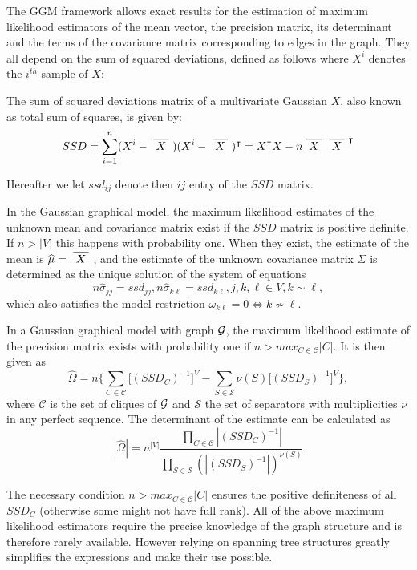 The GGM framework allows exact results for the estimation of maximum likelihood estimators of the mean vector, the precision matrix, its determinant and the terms of the covariance matrix corresponding to edges in the graph. They all depend on the sum of squared deviations, defined as follows where $X^i$ denotes the $i^{th}$ sample of $X$:
\begin{definition}
The sum of squared deviations matrix of a multivariate Gaussian $X$, also known as total sum of squares,  is given by:
$$SSD = \sum_{i=1}^n (X^i - \xbar{X})(X^i - \xbar{X})^\intercal = X^\intercal X - n  \xbar{X} \xbar{X}^\intercal$$
\end{definition}
Hereafter we let $ssd_{ij}$ denote then $ij$ entry of the $SSD$ matrix.
\begin{theorem}
In the Gaussian graphical model,  the maximum likelihood estimates of the unknown mean and covariance matrix exist if the $SSD$ matrix is positive definite. If $n>|V|$ this happens with probability one. When they exist, the estimate of the mean is $\widehat{\mu} = \xbar{X}$, and the estimate of the unknown covariance matrix $\Sigma$ is determined as the unique solution of the system of equations
$$n\widehat{\sigma}_{jj} = ssd_{jj}, n\widehat{\sigma}_{k\ell} = ssd_{k\ell}, j,k,\ell \in V, k\sim\ell,$$
which also satisfies the model restriction $\omega_{k\ell} =0 \iff k\nsim \ell $.
\end{theorem}

\begin{theorem}
In a Gaussian graphical model with graph $\mathcal{G}$, the maximum likelihood estimate of the precision matrix exists with probability one if $n>max_{C\in\mathcal{C}}|C|$. It is then given as
$$\widehat{\Omega} = n \bigg\{\sum_{C\in\mathcal{C}} \big[(SSD_C)^{-1}\big]^V-\sum_{S\in\mathcal{S}} \nu(S) \big[(SSD_S)^{-1}\big]^V \bigg\},$$
where $\mathcal{C}$ is the set of cliques of $\mathcal{G}$ and $\mathcal{S}$ the set of separators with multiplicities $\nu$ in any perfect sequence. The determinant of the estimate can be calculated as
$$|\widehat{\Omega}| = n^{|V|} \dfrac{\prod_{C\in\mathcal{C}}|(SSD_C)^{-1}|}{\prod_{S\in\mathcal{S}} (|(SSD_S)^{-1}|)^{\nu(S)}}$$
\end{theorem}
 
The necessary condition $n>max_{C\in\mathcal{C}}|C|$  ensures the positive definiteness of all $SSD_C$ (otherwise some might not have full rank). All of the above maximum likelihood estimators require the precise knowledge of the graph structure and is therefore rarely available. However relying on spanning tree structures greatly simplifies the expressions and make their use possible.

